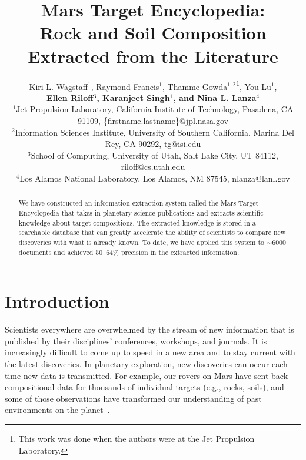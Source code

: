 \documentclass[letterpaper]{article} %
\begin{document}
%
\title{Mars Target Encyclopedia: \\ Rock and Soil Composition Extracted
from the Literature}
\author{
Kiri L. Wagstaff$^1$,
Raymond Francis$^1$,
Thamme Gowda$^{1,2}$\thanks{This work was done when the authors were at
the Jet Propulsion Laboratory.},
You Lu$^1$,\\
{\Large \bf 
Ellen Riloff$^3$, 
Karanjeet Singh$^1$\footnotemark[1], and
Nina L. Lanza$^4$}\\
$^1$Jet Propulsion Laboratory, California Institute of Technology,
Pasadena, CA 91109, \{firstname.lastname\}@jpl.nasa.gov\\
$^2$Information Sciences Institute, University of Southern
California,
Marina Del Rey, CA 90292, tg@isi.edu\\
$^3$School of Computing, University of Utah,
Salt Lake City, UT 84112, riloff@cs.utah.edu\\
$^4$Los Alamos National Laboratory, Los Alamos, NM 87545,
nlanza@lanl.gov\\
}
\maketitle
\begin{abstract}
We have constructed an information extraction system called the Mars
Target Encyclopedia that takes in planetary science publications
and extracts scientific knowledge about target compositions.
The extracted knowledge is stored in a searchable database that can
greatly accelerate the ability of scientists to compare new
discoveries with what is already known.  To date, we have applied this
system to $\sim$6000 documents and achieved 50--64\% precision in the
extracted information.  
\end{abstract}

\section{Introduction}

Scientists everywhere are overwhelmed by the stream of new information
that is published by their disciplines' conferences, workshops, and
journals.  It is increasingly difficult to come up to speed in a
new area and to stay current with the latest discoveries.  In
planetary exploration, new discoveries can occur each time
new data is transmitted.  For example, our rovers on Mars have sent
back compositional data for thousands of individual targets (e.g.,
rocks, soils), and some of those observations have transformed our
understanding of past environments on the
planet~\cite{grotzinger:ykb14}. 
\end{document}
